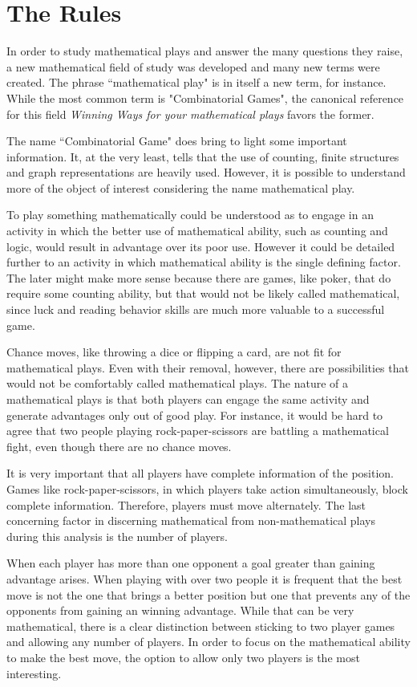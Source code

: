 \section*{The Rules}

In order to study mathematical plays and answer the many questions they raise, a new mathematical field of study was developed and many new terms were created. The phrase ``mathematical play" is in itself a new term, for instance. While the most common term is "Combinatorial Games", the canonical reference for this field \textit{Winning Ways for your mathematical plays} favors the former.

The name ``Combinatorial Game" does bring to light some important information. It, at the very least, tells that the use of counting, finite structures and graph representations are heavily used. However, it is possible to understand more of the object of interest considering the name mathematical play.

To play something mathematically could be understood as to engage in an activity in which the better use of mathematical ability, such as counting and logic, would result in advantage over its poor use. However it could be detailed further to an activity in which mathematical ability is the single defining factor. The later might make more sense because there are games, like poker, that do require some counting ability, but that would not be likely called mathematical, since luck and reading behavior skills are much more valuable to a successful game.

Chance moves, like throwing a dice or flipping a card, are not fit for mathematical plays. Even with their removal, however, there are possibilities that would not be comfortably called mathematical plays. The nature of a mathematical plays is that both players can engage the same activity and generate advantages only out of good play. For instance, it would be hard to agree that two people playing rock-paper-scissors are battling a mathematical fight, even though there are no chance moves.

It is very important that all players have complete information of the position. Games like rock-paper-scissors, in which players take action simultaneously, block complete information. Therefore, players must move alternately. The last concerning factor in discerning mathematical from non-mathematical plays during this analysis is the number of players.

When each player has more than one opponent a goal greater than gaining advantage arises. When playing with over two people it is frequent that the best move is not the one that brings a better position but one that prevents any of the opponents from gaining an winning advantage. While that can be very mathematical, there is a clear distinction between sticking to two player games and allowing any number of players. In order to focus on the mathematical ability to make the best move, the option to allow only two players is the most interesting.

